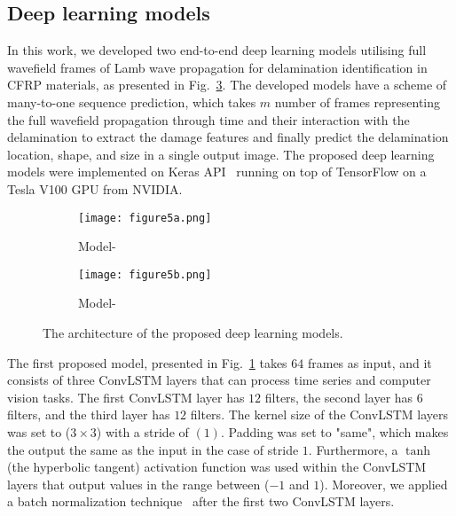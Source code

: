 \subsection{Deep learning models}
\label{proposed_approach}
In this work, we developed two end-to-end deep learning models utilising full wavefield frames of Lamb wave propagation for delamination identification in CFRP materials, as presented in Fig.~\ref{fig:proposed_models}.
The developed models have a scheme of many-to-one sequence prediction, which takes \(m\) number of frames representing the full wavefield propagation through time and their interaction with the delamination to extract the damage features and finally predict the delamination location, shape, and size in a single output image.
The proposed deep learning models were implemented on Keras API~\cite{chollet2015keras} running on top of TensorFlow on a Tesla V100 GPU from NVIDIA.
\begin{figure} [!h]
	\centering
	\begin{subfigure}[b]{0.49\textwidth}
		\centering
		\texttt{[image: figure5a.png]}
		\caption{Model-} %
		\label{fig:convlstm_model}
	\end{subfigure}
	\hfill
	\begin{subfigure}[b]{0.49\textwidth}
		\centering
		\texttt{[image: figure5b.png]}
		\caption{Model-} %
		\label{fig:AE_convlstm}
	\end{subfigure}
	\caption{The architecture of the proposed deep learning models.}
	\label{fig:proposed_models}
\end{figure} 

The first proposed model, presented in Fig.~\ref{fig:convlstm_model} takes \(64\) frames as input, and it consists of three ConvLSTM layers that can process time series and computer vision tasks.
The first ConvLSTM layer has \(12\) filters, the second layer has \(6\) filters, and the third layer has \(12\) filters.
The kernel size of the ConvLSTM layers was set to (\(3\times3\)) with a stride of \((1)\). 
Padding was set to "same", which makes the output the same as the input in the case of stride \(1\).
Furthermore, a \(\tanh\) (the hyperbolic tangent) activation function was used within the ConvLSTM layers that output values in the range between (\(-1\) and \(1\)).
Moreover, we applied a batch normalization technique~\cite{Santurkar2018} after the first two ConvLSTM layers.


